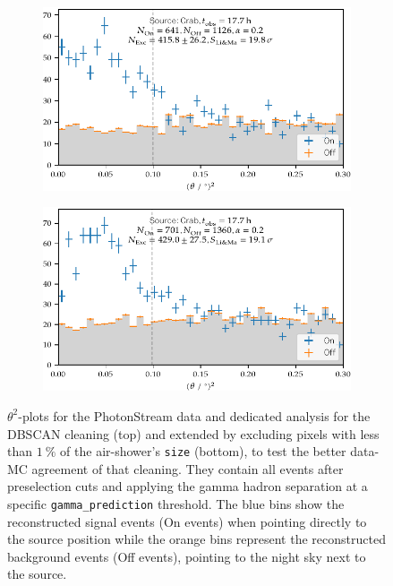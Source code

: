 \begin{figure}
  \begin{subfigure}{\textwidth}
    \centering
    \includegraphics[width=\textwidth]{Plots/results/DBSCAN/theta2_plot.pdf}
  \end{subfigure}
  \begin{subfigure}{\textwidth}
    \centering
    \includegraphics[width=\textwidth]{Plots/results/DBSCAN_perc/theta2_plot.pdf}
  \end{subfigure}
  \caption{$\theta^2$-plots for the PhotonStream data and dedicated analysis for the DBSCAN cleaning (top) and extended by excluding pixels with less than $\SI{1}{\percent}$ of the air-shower's \texttt{size} (bottom), to test the better data-MC agreement of that cleaning. They contain all events after preselection cuts and applying the gamma hadron separation at a specific \texttt{gamma\_prediction} threshold. The blue bins show the reconstructed signal events (On events) when pointing directly to the source position while the orange bins represent the reconstructed background events (Off events), pointing to the night sky next to the source.}
  \label{fig:theta2}
\end{figure}
%
